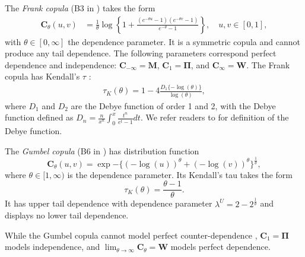 The {\em Frank copula\/} (B3 in \citet{joe1997multivariate}) takes the form
\begin{align*}
    \bm{C}_{\theta}(u,v) &= \frac{1}{\theta}
    \log \left\{
    1 + \frac{(e^{-\theta u}-1)(e^{-\theta v}-1)}{e^{-\theta}-1}
    \right\}, \quad u,v\in [0,1],
    \end{align*}
    with $\theta \in [0, \infty]$ the dependence parameter. 
    It is a symmetric copula and cannot produce any tail
    dependence. The following parameters correspond perfect dependence
    and independence: $\bm{C}_{-\infty} = \bm{M}$, $\bm{C}_1 = \bm{\Pi}$,
    and $\bm{C}_\infty = \bm{W}$. 
    The Frank copula has Kendall's $\tau$ :
\begin{align*}
    \tau_K(\theta) = 1-4\frac{D_1\{-\log(\theta)\}}{\log(\theta)},
    \end{align*}
where $D_1$ and $D_2$ are the Debye function of order 1 and 2, with
the Debye function defined as $D_n =
\frac{n}{x^n}\int_0^x\frac{t^n}{e^t-1}dt$.
We refer readers to \citet[p.998]{abramowitz1972handbook} for definition of the Debye function. 

The {\em Gumbel copula\/} (B6 in \citet{joe1997multivariate}) has
distribution function
\begin{equation*}
  \bm{C}_{\theta}(u,v) = \exp{-\{ (-\log(u))^\theta +(-\log(v))^\theta 
    \}^{\frac{1}{\theta}}},
\end{equation*}
where $\theta \in [1,\infty)$ is the dependence parameter.
Its  Kendall's tau takes the form \begin{equation*}
  \tau_K(\theta) =\frac{\theta-1}{\theta}. 
 \end{equation*}
It has upper tail dependence with dependence parameter $\lambda^U
= 2-2^{\frac{1}{\theta}}$ and displays no lower tail dependence. 
    
While the Gumbel copula cannot model perfect counter-dependence
\citep{Nelsen2002}, $\bm{C}_{1} = \bm{\Pi}$ models independence, 
and $\lim_{\theta\rightarrow\infty} \bm{C}_\theta = \bm{W}$ models
perfect dependence. 


